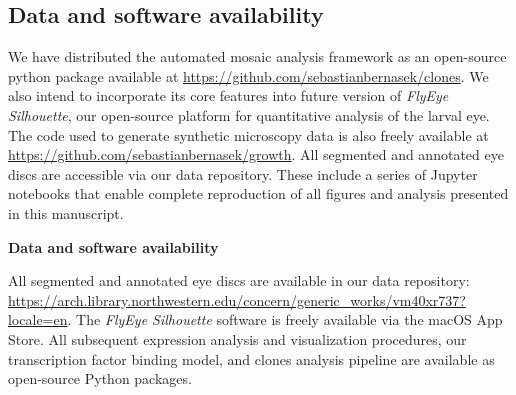 
\subsection{Data and software availability}

We have distributed the automated mosaic analysis framework as an open-source python package available at \url{https://github.com/sebastianbernasek/clones}. We also intend to incorporate its core features into future version of \emph{FlyEye Silhouette}, our open-source platform for quantitative analysis of the larval eye. The code used to generate synthetic microscopy data is also freely available at \url{https://github.com/sebastianbernasek/growth}. All segmented and annotated eye discs are accessible via our data repository. These include a series of Jupyter notebooks that enable complete reproduction of all figures and analysis presented in this manuscript.



\textbf{Data and software availability}

All segmented and annotated eye discs are available in our data repository: \url{https://arch.library.northwestern.edu/concern/generic_works/vm40xr737?locale=en}. The \emph{FlyEye Silhouette} software is freely available via the macOS App Store. All subsequent expression analysis and visualization procedures, our transcription factor binding model, and clones analysis pipeline are available as open-source Python packages. 

